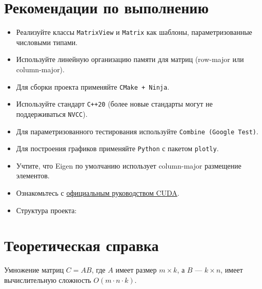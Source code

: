 \documentclass[12pt]{article}
\begin{document}
\section*{Рекомендации по выполнению}
\begin{itemize}
    \item Реализуйте классы \texttt{MatrixView} и \texttt{Matrix} как шаблоны, параметризованные числовыми типами.
    \item Используйте линейную организацию памяти для матриц (row-major или column-major).
    \item Для сборки проекта применяйте \texttt{CMake + Ninja}.
    \item Используйте стандарт \texttt{C++20} (более новые стандарты могут не поддерживаться \texttt{NVCC}).
    \item Для параметризованного тестирования используйте \texttt{Combine (Google Test)}.
    \item Для построения графиков применяйте \texttt{Python} с пакетом \texttt{plotly}.
    \item Учтите, что Eigen по умолчанию использует column-major размещение элементов.
    \item Ознакомьтесь с \href{https://docs.nvidia.com/cuda/cuda-c-programming-guide/#programming-model}{официальным руководством CUDA}.

    \item Структура проекта:
\end{itemize}

\section*{Теоретическая справка}
Умножение матриц $C = AB$, где $A$ имеет размер $m \times k$, а $B$ — $k \times n$, имеет вычислительную сложность $O(m \cdot n \cdot k)$.
\end{document}
